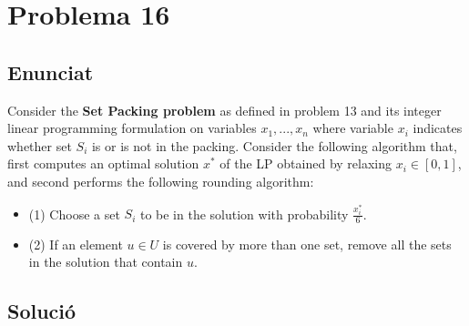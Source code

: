 \section{Problema 16}
\subsection{Enunciat}
Consider the \textbf{Set Packing problem} as defined in problem 13 and its integer linear programming formulation on variables $x_1,...,x_n$ where variable $x_i$ indicates whether set $S_i$ is or is not in the packing. Consider the following algorithm that, first computes an optimal solution $x^{*}$ of the LP obtained by relaxing $x_i \in [0,1]$, and second performs the following rounding algorithm:
\begin{itemize}
    \item (1) Choose a set $S_i$ to be in the solution with probability $\frac{x^{*}_i}{6}$.\\
    \item (2) If an element $u \in U$ is covered by more than one set, remove all the sets in the solution that contain $u$.
\end{itemize}
\subsection{Solució}